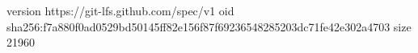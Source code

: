 version https://git-lfs.github.com/spec/v1
oid sha256:f7a880f0ad0529bd50145ff82e156f87f69236548285203dc71fe42e302a4703
size 21960
